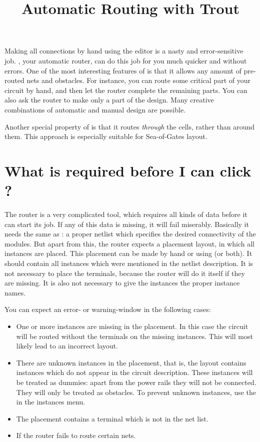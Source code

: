 \title{Automatic Routing with Trout}
\maketitle
\label{routeman}
Making all connections by hand using the editor is a nasty and error-sensitive
job. , your automatic router, can do this job for you much quicker
and without errors.  One of the most interesting features of  is
that it allows any amount of pre-routed nets and obstacles.  For instance, you
can route some critical part of your circuit by hand, and then let the router
complete the remaining parts. You can also ask the router to make only a part
of the design. Many creative combinations of automatic and manual design are
possible.

Another special property of  is that it routes {\em through} the
cells, rather than around them. This approach is especially suitable for
Sea-of-Gates layout.

\section{What is required before I can click \protect{}?}
The router is a very complicated tool,
which requires all kinds of data before
it can start its job.
If any of this data is missing,
it will fail miserably.
Basically it needs the same as : a proper netlist which
specifies the desired connectivity of the modules.
But apart from this,
the router expects a placement layout,
in which all instances are placed.
This placement can be made by hand or using  (or both).
It should contain all instances which were mentioned in the netlist description.
It is not necessary to place the terminals,
because the router will do it itself if they are missing.
It is also not necessary to give the instances the proper instance names.

You can expect an error- or warning-window in the following cases:
\begin{itemize}
\item
One or more instances are missing in the placement. In this
case the circuit will be routed without the terminals on
the missing instances. This will most likely lead to an
incorrect layout.
\item
There are unknown instances in the placement, that is, the
layout contains instances which do not appear in the
circuit description. These instances will be treated as
dummies: apart from the power rails they will not be
connected.  They will only be treated as obstacles.  To
prevent unknown instances, use the  in
the instances menu.
\item
The placement contains a terminal which is not in the net
list.
\item
If the router fails to route certain nets.
\end{itemize}

